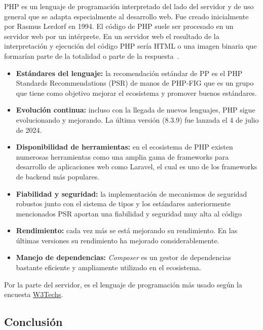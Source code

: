 PHP es un lenguaje de programación interpretado del lado del servidor y de uso general que se adapta especialmente al desarrollo web. Fue creado inicialmente por Rasmus Lerdorf en 1994. El código de PHP suele ser procesado en un servidor web por un intérprete. En un servidor web el resultado de la interpretación y ejecución del código PHP sería HTML o una imagen binaria que formarían parte de la totalidad o parte de la respuesta~\cite{php-wiki}.

\begin{itemize}
    \item[\bien] \textbf{Estándares del lenguaje:} la recomendación estándar de PP es el PHP Standards Recommendations (PSR) de manos de PHP-FIG que es un grupo que tiene como objetivo mejorar el ecosistema y promover buenos estándares.
    \item[\bien] \textbf{Evolución continua:} incluso con la llegada de nuevos lenguajes, PHP sigue evolucionando y mejorando. La última versión (8.3.9) fue lanzada el 4 de julio de 2024.
    \item[\bien] \textbf{Disponibilidad de herramientas:} en el ecosistema de PHP existen numerosas herramientas como una amplia gama de frameworks para desarrollo de aplicaciones web como Laravel, el cual es uno de los frameworks de backend más populares.
    \item[\esp] \textbf{Fiabilidad y seguridad:} la implementación de mecanismos de seguridad robustos junto con el sistema de tipos y los estándares anteriormente mencionados PSR aportan una fiabilidad y seguridad muy alta al código
    \item[\bien] \textbf{Rendimiento:} cada vez más se está mejorando su rendimiento. En las últimas versiones su rendimiento ha mejorado considerablemente.
    \item[\bien] \textbf{Manejo de dependencias:} \textit{Composer} es un gestor de dependencias bastante eficiente y ampliamente utilizado en el ecosistema.
\end{itemize}

Por la parte del servidor, es el lenguaje de programación más usado según la encuesta \href{https://w3techs.com/technologies/overview/programming_language}{W3Techs}.

\subsection{Conclusión}

